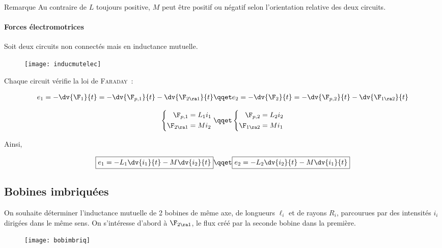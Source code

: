 \documentclass[../main/main.tex]{subfiles}
\begin{document}
\begin{rrema}{Remarque}
  Au contraire de $L$ toujours positive, $M$ peut être positif ou négatif selon
  l'orientation relative des deux circuits.
\end{rrema}

\paragraph*{Forces électromotrices}
Soit deux circuits non connectés mais en inductance mutuelle.
\begin{figure}[h]
  \centering
  \texttt{[image: inducmutelec]}
  \label{fig:inducmutelec}
\end{figure}
\smallbreak
\noindent
Chaque circuit vérifie la loi de \textsc{Faraday}~:
\begin{hide}
  \begin{gather*}
    e_1 = - \dv{\F_1}{t} = -\dv{\F_{p,1}}{t} - \dv{\F_{2\ra 1}}{t}
    \qqet 
    e_2 = - \dv{\F_2}{t} = -\dv{\F_{p,2}}{t} - \dv{\F_{1\ra 2}}{t}
  \end{gather*}
\end{hide}
\noindent
\begin{hide}
  \begin{gather*}
    \left\{
      \begin{aligned}{}
        \F_{p,1} &= L_1i_1
        \\
        \F_{2\ra 1} &= Mi_2
      \end{aligned}
    \right.
    \qqet
    \left\{
      \begin{aligned}{}
        \F_{p,2} &= L_2i_2
        \\
        \F_{1\ra 2} &= Mi_1
      \end{aligned}
    \right.
  \end{gather*}
\end{hide}
\noindent
Ainsi,
\begin{hide}
  \[
    \boxed{e_1 = -L_1 \dv{i_1}{t} - M \dv{i_2}{t}}
    \qqet
    \boxed{e_2 = -L_2 \dv{i_2}{t} - M \dv{i_1}{t}}
  \]
\end{hide}

\subsection{Bobines imbriquées}
\label{ssec:inducmutimbriq}
On souhaite déterminer l'inductance mutuelle de 2 bobines de même axe, de
longueurs $\ell_{i}$ et de rayons $R_{i}$, parcourues par des intensités $i_{i}$
dirigées dans le même sens. On s'intéresse d'abord à $\F_{2\ra 1}$, le flux créé
par la seconde bobine dans la première.
\begin{figure}[h]
  \centering
  \texttt{[image: bobimbriq]}
  \label{fig:bobimbriq}
\end{figure}
\end{document}
